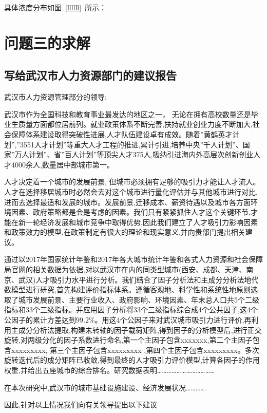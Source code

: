 \documentclass{whutmod}
\begin{document}
具体浓度分布如图~\ref{llllll}~所示：


	\section{问题三的求解}
	
	
	\subsection{写给武汉市人力资源部门的建议报告}
	
武汉市人力资源管理部分的领导:

武汉市作为全国科技和教育事业最发达的地区之一， 无论在拥有高校数量还是毕业生质量方面都位居前列。就业政策体系不断完善,扶持就业创业力度不断加大,社会保障体系建设取得突破性进展,人才队伍建设卓有成效。随着”黄鹤英才计划”,”3551人才计划”等重大人才工程的推进,累计引进,培养中央”千人计划”、国家”万人计划”、省”百人计划”等顶尖人才375人,吸纳引进海内外高层次创新创业人才4000余人,数量居中部城市第一。

人才决定着一个城市的发展前景, 但城市必须拥有足够的吸引力才能让人才流入。人才在选择移居城市时必然会去对这个城市进行量化评估并与其他城市进行对比, 进而去选择最适和发展的城市。发展前景,迁移成本、薪资待遇以及城市各方面环境因素、政府策略都是会是考虑的因素。我们只有紧紧抓住人才这个关键环节,才能在新一轮经济发展和城市竞争中取得优势,因此我们建立了人才吸引力影响因素和政策效力的模型,在政策制定有很大的理论和现实意义,并向贵部门提出相关建议。

通过以2017年国家统计年鉴和2017年各大城市统计年鉴和各式人力资源和社会保障局官网的相关数据为依据,对以武汉市在内的同类型城市(西安、成都、天津、南京、武汉)人才吸引力水平进行分析。我们结合了因子分析法和主成分分析法地代数模型进行研究,首先构建评价指标体系。遵循客观地、科学性和系统性地原则选取了城市发展前景、主要行业收入、政府影响、环境因素、年末总人口共5个二级指标和33个三级指标。并应用因子分析将33个三级指标综合成4个公共因子,这4个公因子的累计方差达到$99.2\%$。用这4个公因子来对武汉城市吸引力进行评价,再利用主成分分析法提取,构建未转轴的因子载荷矩阵,得到因子的分析模型后,进行正交旋转,对两级分化的因子系数进行命名,第一个主因子包含xxxxxxx,第二个主因子包含xxxxxxxxx, 第三个主因子包含xxxxxxxxx ,第四个主因子包含xxxxxxxxx。多次旋转迭代后的成分矩阵已收敛,得到最终的人才吸引力评价模型,计算各因子的作用权重,并给出五座城市的综合排名。研究数据表明………………………………


在本次研究中,武汉市的城市基础设施建设、经济发展状况………….


因此,针对以上情况我们向有关领导提出以下建议
\end{document}
